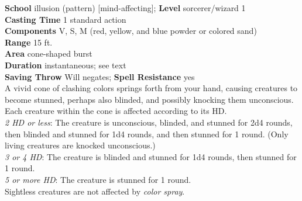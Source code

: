 \textbf{School} illusion (pattern) [mind-affecting]; \textbf{Level} sorcerer/wizard 1\\
\textbf{Casting Time} 1 standard action\\
\textbf{Components} V, S, M (red, yellow, and blue powder or colored sand)\\
\textbf{Range} 15 ft.\\
\textbf{Area} cone-shaped burst\\
\textbf{Duration} instantaneous; see text\\
\textbf{Saving Throw }Will negates; \textbf{Spell Resistance} yes\\
A vivid cone of clashing colors springs forth from your hand, causing creatures to become stunned, perhaps also blinded, and possibly knocking them unconscious. Each creature within the cone is affected according to its HD.\\
\textit{2 HD or less}: The creature is unconscious, blinded, and stunned for 2d4 rounds, then blinded and stunned for 1d4 rounds, and then stunned for 1 round. (Only living creatures are knocked unconscious.)\\
\textit{3 or 4 HD}: The creature is blinded and stunned for 1d4 rounds, then stunned for 1 round.\\
\textit{5 or more HD}: The creature is stunned for 1 round.\\
Sightless creatures are not affected by \textit{color spray}.\\
